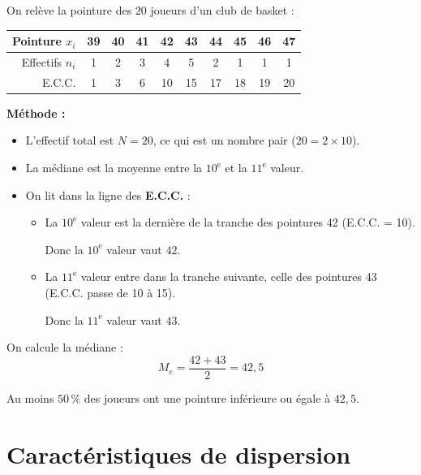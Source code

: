 \begin{ex}
	On relève la pointure des $20$ joueurs d'un club de basket :

	\begin{center}
		\begin{tabular}{|r|c|c|c|c|c|c|c|c|c|} \hline
			\rowcolor{gray!30} Pointure $x_i$ & 39 & 40 & 41 & 42 & 43 & 44 & 45 & 46 & 47 \\ \hline
			Effectifs $n_i$                   & 1  & 2  & 3  & 4  & 5  & 2  & 1  & 1  & 1  \\ \hline
			E.C.C.                            & 1  & 3  & 6  & 10 & 15 & 17 & 18 & 19 & 20 \\ \hline
		\end{tabular}
	\end{center}

	\textbf{Méthode :}
	\begin{itemize}
		\item L'effectif total est $N = 20$, ce qui est un nombre pair ($20 = 2 \times 10$).
		\item La médiane est la moyenne entre la $10^{\text{e}}$ et la $11^{\text{e}}$ valeur.
		\item On lit dans la ligne des \textbf{E.C.C.} :
		      \begin{itemize}
			      \item La $10^{\text{e}}$ valeur est la dernière de la tranche des pointures 42 (E.C.C. = 10).

			            Donc la $10^{\text{e}}$ valeur vaut $42$.
			      \item La $11^{\text{e}}$ valeur entre dans la tranche suivante, celle des pointures 43 (E.C.C. passe de 10 à 15).

			            Donc la $11^{\text{e}}$ valeur vaut $43$.
		      \end{itemize}
	\end{itemize}

	On calcule la médiane :
	\[
		M_e = \dfrac{42 + 43}{2} = 42{,}5
	\]

	Au moins $50\,\%$ des joueurs ont une pointure inférieure ou égale à $42{,}5$.
\end{ex}

\section{Caractéristiques de dispersion}


